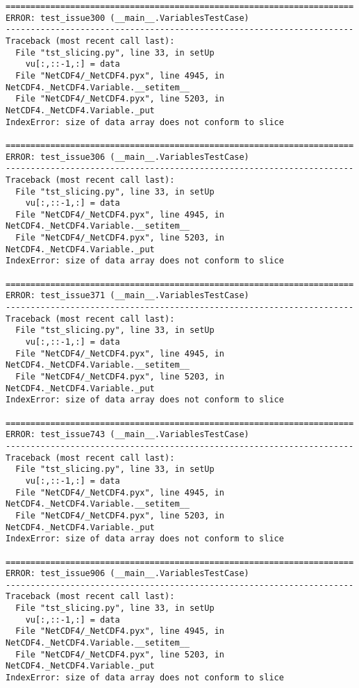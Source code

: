 \begin{verbatim}
======================================================================
ERROR: test_issue300 (__main__.VariablesTestCase)
----------------------------------------------------------------------
Traceback (most recent call last):
  File "tst_slicing.py", line 33, in setUp
    vu[:,::-1,:] = data
  File "NetCDF4/_NetCDF4.pyx", line 4945, in NetCDF4._NetCDF4.Variable.__setitem__
  File "NetCDF4/_NetCDF4.pyx", line 5203, in NetCDF4._NetCDF4.Variable._put
IndexError: size of data array does not conform to slice

======================================================================
ERROR: test_issue306 (__main__.VariablesTestCase)
----------------------------------------------------------------------
Traceback (most recent call last):
  File "tst_slicing.py", line 33, in setUp
    vu[:,::-1,:] = data
  File "NetCDF4/_NetCDF4.pyx", line 4945, in NetCDF4._NetCDF4.Variable.__setitem__
  File "NetCDF4/_NetCDF4.pyx", line 5203, in NetCDF4._NetCDF4.Variable._put
IndexError: size of data array does not conform to slice

======================================================================
ERROR: test_issue371 (__main__.VariablesTestCase)
----------------------------------------------------------------------
Traceback (most recent call last):
  File "tst_slicing.py", line 33, in setUp
    vu[:,::-1,:] = data
  File "NetCDF4/_NetCDF4.pyx", line 4945, in NetCDF4._NetCDF4.Variable.__setitem__
  File "NetCDF4/_NetCDF4.pyx", line 5203, in NetCDF4._NetCDF4.Variable._put
IndexError: size of data array does not conform to slice

======================================================================
ERROR: test_issue743 (__main__.VariablesTestCase)
----------------------------------------------------------------------
Traceback (most recent call last):
  File "tst_slicing.py", line 33, in setUp
    vu[:,::-1,:] = data
  File "NetCDF4/_NetCDF4.pyx", line 4945, in NetCDF4._NetCDF4.Variable.__setitem__
  File "NetCDF4/_NetCDF4.pyx", line 5203, in NetCDF4._NetCDF4.Variable._put
IndexError: size of data array does not conform to slice

======================================================================
ERROR: test_issue906 (__main__.VariablesTestCase)
----------------------------------------------------------------------
Traceback (most recent call last):
  File "tst_slicing.py", line 33, in setUp
    vu[:,::-1,:] = data
  File "NetCDF4/_NetCDF4.pyx", line 4945, in NetCDF4._NetCDF4.Variable.__setitem__
  File "NetCDF4/_NetCDF4.pyx", line 5203, in NetCDF4._NetCDF4.Variable._put
IndexError: size of data array does not conform to slice


\end{verbatim}
